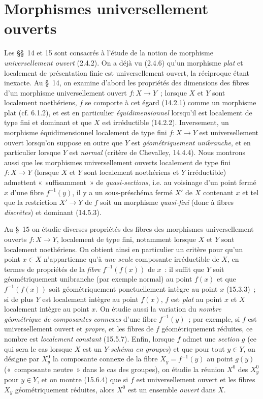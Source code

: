 \section{Morphismes universellement ouverts}
\label{section:IV.14-fr}

Les \S\S~14 et 15 sont consacrés à l'étude de la notion de morphisme
\emph{universellement ouvert} (2.4.2). On a déjà vu (2.4.6) qu'un morphisme
\emph{plat} et localement de présentation finie est universellement ouvert, la
réciproque étant inexacte. Au \S~14, on examine d'abord les propriétés des
dimensions des fibres d'un morphisme universellement ouvert $f:X\to Y$~;
lorsque $X$ et $Y$ sont localement noethériens, $f$ se comporte à cet égard
(14.2.1) comme un morphisme plat (cf. 6.1.2), et est en particulier
\emph{équidimensionnel} lorsqu'il est localement de type fini et dominant et que
$X$ est irréductible (14.2.2). Inversement, un morphisme équidimensionnel
localement de type fini $f:X\to Y$ est universellement ouvert lorsqu'on suppose
en outre que $Y$ est \emph{géométriquement unibranche}, et en particulier lorsque
$Y$ est \emph{normal} (critère de Chevalley, 14.4.4). Nous montrons aussi que les
morphismes universellement ouverts localement de type fini $f:X\to Y$ (lorsque
$X$ et $Y$ sont
localement noethériens et $Y$ irréductible) admettent «~suffisamment~» de
\emph{quasi-sections}, i.e. au voisinage d'un point fermé $x$ d'une fibre
$f^{-1}(y)$, il y a un sous-préschéma fermé $X'$ de $X$ contenant $x$ et tel que
la restriction $X'\to Y$ de $f$ soit un morphisme \emph{quasi-fini} (donc à fibres
\emph{discrètes}) et dominant (14.5.3).

Au \S~15 on étudie diverses propriétés des fibres des morphismes universellement
ouverts $f:X\to Y$, localement de type fini, notamment lorsque $X$ et $Y$ sont
localement noethériens. On obtient ainsi en particulier un critère pour qu'un
point $x\in X$ n'appartienne qu'à \emph{une seule} composante irréductible de $X$,
en termes de propriétés de la \emph{fibre} $f^{-1}(f(x))$ de $x$~: il suffit que
$Y$ soit géométriquement unibranche (par exemple normal) au point $f(x)$ et que
$f^{-1}(f(x))$ soit géométriquement ponctuellement intègre au point $x$ (15.3.3)~;
si de plus $Y$ est localement intègre au point $f(x)$, $f$ est \emph{plat} au point
$x$ et $X$ localement intègre au point $x$. On étudie aussi la variation du
\emph{nombre géométrique de composantes connexes} d'une fibre $f^{-1}(y)$~; par
exemple, si $f$ est universellement ouvert et \emph{propre}, et les fibres de $f$
géométriquement réduites, ce nombre est \emph{localement constant} (15.5.7).
Enfin, lorsque $f$ admet une \emph{section} $g$ (ce qui sera le cas lorsque $X$ est
un $Y$-\emph{schéma en groupes}) et que pour tout $y\in Y$, on désigne par $X_y^0$
la composante connexe de la fibre $X_y=f^{-1}(y)$ au point $g(y)$ («~composante
neutre~» dans le cas des groupes), on étudie la réunion $X^0$ des $X_y^0$ pour
$y\in Y$, et on montre (15.6.4) que si $f$ est universellement ouvert et les fibres
$X_y$ géométriquement réduites, alors $X^0$ est un ensemble \emph{ouvert} dans $X$.

